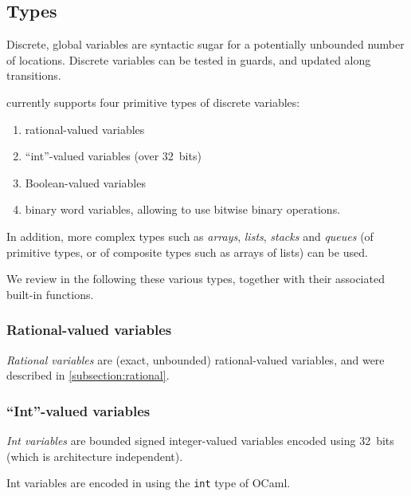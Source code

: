 \subsection{Types}

Discrete, global variables are syntactic sugar for a potentially unbounded number of locations.
Discrete variables can be tested in guards, and updated along transitions.

\imitator{} currently supports four primitive types of discrete variables:
\begin{enumerate}
	\item rational-valued variables
	\item ``int''-valued variables (over 32~bits)
	\item Boolean-valued variables
	\item binary word variables, allowing to use bitwise binary operations.
\end{enumerate}

In addition, more complex types such as \emph{arrays}, \emph{lists}, \emph{stacks} and \emph{queues} (of primitive types, or of composite types such as arrays of lists) can be used.

We review in the following these various types, together with their associated built-in functions.


\subsubsection{Rational-valued variables}

\emph{Rational variables} are (exact, unbounded) rational-valued variables, and were described in \cref{subsection:rational}.

\subsubsection{``Int''-valued variables}\label{sss:int}

\emph{Int variables} are bounded signed integer-valued variables encoded using 32~bits (which is architecture independent).

Int variables are encoded in \imitator{} using the \texttt{int} type of OCaml.

